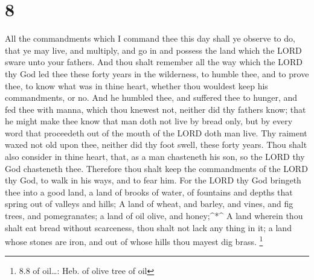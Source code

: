 \hypertarget{section-7}{%
\section{8}\label{section-7}}

 All the commandments which I command thee this day shall ye
observe to do, that ye may live, and multiply, and go in and possess the
land which the LORD sware unto your fathers.  And thou shalt
remember all the way which the LORD thy God led thee these forty years
in the wilderness, to humble thee, and to prove thee, to know what was
in thine heart, whether thou wouldest keep his commandments, or no.
 And he humbled thee, and suffered thee to hunger, and fed
thee with manna, which thou knewest not, neither did thy fathers know;
that he might make thee know that man doth not live by bread only, but
by every word that proceedeth out of the mouth of the LORD doth man
live.  Thy raiment waxed not old upon thee, neither did thy
foot swell, these forty years.  Thou shalt also consider in
thine heart, that, as a man chasteneth his son, so the LORD thy God
chasteneth thee.  Therefore thou shalt keep the commandments
of the LORD thy God, to walk in his ways, and to fear him. 
For the LORD thy God bringeth thee into a good land, a land of brooks of
water, of fountains and depths that spring out of valleys and hills;
 A land of wheat, and barley, and vines, and fig trees, and
pomegranates; a land of oil olive, and honey;\^{}*\^{}  A
land wherein thou shalt eat bread without scarceness, thou shalt not
lack any thing in it; a land whose stones are iron, and out of whose
hills thou mayest dig brass. \footnote{8.8 of oil\ldots: Heb. of olive
  tree of oil}

